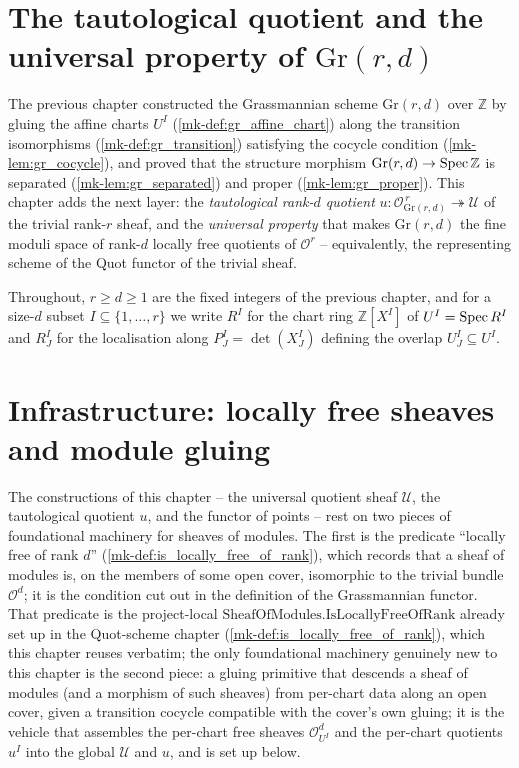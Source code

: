 \section{The tautological quotient and the universal property of $\mathrm{Gr}(r,d)$}
\label{mk-chap:Picard_GrassmannianQuot}

\providecommand{\ShMod}{\mathrm{SheafOfModules}}

The previous chapter constructed the Grassmannian scheme \(\mathrm{Gr}(r,d)\) over
\(\mathbb{Z}\) by gluing the affine charts \(U^I\)
(\ref{mk-def:gr_affine_chart}) along the transition isomorphisms
(\ref{mk-def:gr_transition}) satisfying the cocycle condition
(\ref{mk-lem:gr_cocycle}), and proved that the structure morphism
\(\mathrm{Gr}(r,d) \to \operatorname{Spec} \mathbb{Z}\) is separated (\ref{mk-lem:gr_separated})
and proper (\ref{mk-lem:gr_proper}). This chapter adds the next layer: the
\emph{tautological rank-\(d\) quotient}
\(u : \mathcal{O}_{\mathrm{Gr}(r,d)}^{\,r} \twoheadrightarrow \mathcal{U}\) of the
trivial rank-\(r\) sheaf, and the \emph{universal property} that makes
\(\mathrm{Gr}(r,d)\) the fine moduli space of rank-\(d\) locally free quotients of
\(\mathcal{O}^{r}\) -- equivalently, the representing scheme of the Quot functor
of the trivial sheaf.

Throughout, \(r \ge d \ge 1\) are the fixed integers of the previous chapter, and
for a size-\(d\) subset \(I \subseteq \{1,\dots,r\}\) we write \(R^I\) for the
chart ring \(\mathbb{Z}[X^I]\) of \(U^I = \operatorname{Spec} R^I\) and \(R^I_J\) for the
localisation along \(P^I_J = \det(X^I_J)\) defining the overlap
\(U^I_J \subseteq U^I\).

\section{Infrastructure: locally free sheaves and module gluing}
\label{mk-sec:grquot_infra}

The constructions of this chapter -- the universal quotient sheaf
\(\mathcal{U}\), the tautological quotient \(u\), and the functor of points -- rest
on two pieces of foundational machinery for sheaves of modules. The first is the
predicate ``locally free of rank \(d\)'' (\ref{mk-def:is_locally_free_of_rank}),
which records that a sheaf of modules is, on the members of some open cover,
isomorphic to the trivial bundle \(\mathcal{O}^{d}\); it is the condition cut out
in the definition of the Grassmannian functor. That predicate is the project-local
\(\mathrm{SheafOfModules.IsLocallyFreeOfRank}\) already set up in the Quot-scheme
chapter (\ref{mk-def:is_locally_free_of_rank}), which this chapter reuses verbatim;
the only foundational machinery genuinely new to this chapter is the second piece:
a gluing primitive that descends a sheaf of modules (and a morphism of such
sheaves) from per-chart data along an open cover, given a transition cocycle
compatible with the cover's own gluing; it is the vehicle that assembles the
per-chart free sheaves \(\mathcal{O}^{d}_{U^I}\) and the per-chart quotients
\(u^I\) into the global \(\mathcal{U}\) and \(u\), and is set up below.

